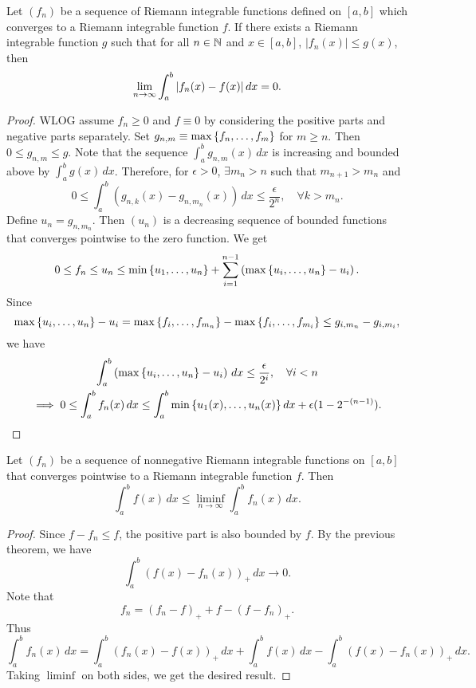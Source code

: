 \begin{thm}
    Let $(f_n)$ be a sequence of Riemann integrable functions defined on $[a, b]$ which converges to a Riemann integrable function $f$. If there exists a Riemann integrable function $g$ such that for all $n \in {\mathbb N}$ and $x \in [a, b]$, $|f_n(x)| \leq g(x)$, then
    \[
    \lim_{n \to \infty} \int_a^b {\left| f_n(x) - f(x) \right|} \, dx = 0.
    \]
    \begin{proof}
        WLOG assume $f_n \geq 0$ and $f \equiv 0$ by considering the positive parts and negative parts separately. Set $g_{n, m} \equiv \max{\left\{{f_n, \ldots, f_m}\right\}}$ for $m \geq n$. Then $0 \leq g_{n, m} \leq g$. Note that the sequence $\int_a^b g_{n, m}(x) \, dx$ is increasing and bounded above by $\int_a^b g(x) \, dx$. Therefore, for $\epsilon > 0$, $\exists m_n > n$ such that $m_{n+1} > m_n$ and
        \[
        0 \leq \int_a^b \left(g_{n, k}(x) - g_{n, m_n}(x)\right) \, dx \leq \frac{\epsilon}{2^n}, \quad \forall k > m_n.
        \]
        Define $u_n = g_{n, m_n}$. Then $(u_n)$ is a decreasing sequence of bounded functions that converges pointwise to the zero function. We get
        \[
        0 \leq f_n \leq u_n \leq \min{\left\{{u_1, \ldots, u_n}\right\}} + \sum_{i=1}^{n-1} \left(\max{\left\{{u_i, \ldots, u_n}\right\}} - u_i\right).
        \]
        Since
        \[
        \max{\left\{{u_i, \ldots, u_n}\right\}} - u_i = \max{\left\{{f_i, \ldots, f_{m_n}}\right\}} - \max{\left\{{f_i, \ldots, f_{m_i}}\right\}} \leq g_{i, m_n} - g_{i, m_i},
        \]
        we have
        \begin{gather*}
            \int_a^b \left(\max{\left\{{u_i, \ldots, u_n}\right\}} - u_i\right) \, dx \leq \frac{\epsilon}{2^i}, \quad \forall i < n \\
            \implies 0 \leq \int_a^b f_n(x) \, dx \leq \int_a^b \min{\left\{{u_1(x), \ldots, u_n(x)}\right\}} \, dx + \epsilon(1 - 2^{-(n-1)}).
        \end{gather*}
    \end{proof}
\end{thm}

\begin{thm}
    Let $(f_n)$ be a sequence of nonnegative Riemann integrable functions on $[a, b]$ that converges pointwise to a Riemann integrable function $f$. Then
    \[
    \int_a^b f(x) \, dx \leq \liminf_{n \to \infty} \int_a^b f_n(x) \, dx.
    \]
    \begin{proof}
        Since $f - f_n \leq f$, the positive part is also bounded by $f$. By the previous theorem, we have
        \[
        \int_a^b (f(x) - f_n(x))_+ \, dx \to 0.
        \]
        Note that
        \[
        f_n = (f_n - f)_+ + f - (f - f_n)_+.
        \]
        Thus
        \[
        \int_a^b f_n(x) \, dx = \int_a^b (f_n(x) - f(x))_+ \, dx + \int_a^b f(x) \, dx - \int_a^b (f(x) - f_n(x))_+ \, dx.
        \]
        Taking $\liminf$ on both sides, we get the desired result.
    \end{proof}
\end{thm}

